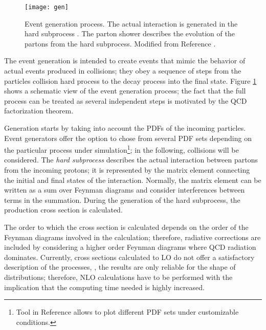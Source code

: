\begin{figure}[!h]
  \centering
  \texttt{[image: gen]}
  \caption[Event generation process.]{Event generation process. %
    The actual interaction is generated in the hard subprocess%
    . The parton shower describes the evolution of the partons from the hard subprocess.%
     Modified from Reference \cite{gen_scheme}.}\label{fig:gen}
\end{figure}

The event generation is intended to create events that mimic the behavior of actual events produced in collisions; they obey a sequence of steps from the particles collision hard process to the decay process into the final state. Figure \ref{fig:gen} shows a schematic view of the event generation process; the fact that the full process can be treated as several independent steps is motivated by the QCD factorization theorem.     

Generation starts by taking into account the PDFs of the incoming particles. Event generators offer the option to chose from several PDF sets depending on the particular process under simulation\footnote{Tool in Reference \cite{pdfplot} allows to plot different PDF sets under customizable conditions.}; in the following, \pp collisions will be considered. The \textit{hard subprocess} describes the actual interaction between partons from the incoming protons; it is represented by the matrix element connecting the initial and final states of the interaction. Normally, the matrix element can be written as a sum over Feynman diagrams and consider interferences between terms in the summation. During the generation of the hard subprocess, the production cross section is calculated. 

The order to which the cross section is calculated depends on the order of the Feynman diagrams involved in the calculation; therefore, radiative corrections are included by considering a higher order Feynman diagrams where QCD radiation dominates. Currently, cross sections calculated to LO do not offer a satisfactory description of the processes, \ie, the results are only reliable for the shape of distributions; therefore, NLO calculations have to be performed with the implication that the computing time needed is highly increased.       

